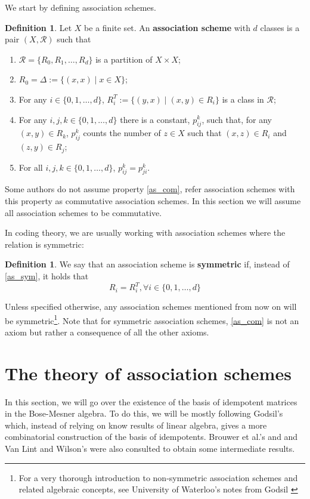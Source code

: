\documentclass[a4paper,12pt]{article}
\theoremstyle{plain}
\theoremstyle{definition}
\newtheorem{definition}[theorem]{Definition}
\theoremstyle{remark}
\begin{document}
We start by defining association schemes.
\begin{definition}
    \label{def:association_scheme_partition}
    Let $ X $ be a finite set. An \textbf{association scheme} with $ d $ classes is a
    pair $ (X, \mathcal{R}) $ such that
    \begin{enumerate}[label=(\roman*)]
        \item $ \mathcal{R} = \{ R_0, R_1, \dots, R_d \} $ is a partition of
            $ X \times X $;
        \item $ R_0 = \Delta := \{ (x,x) \mid x \in X \} $;
        \item \label{as_sym}
            For any $ i \in \{ 0,1,\dots,d \} $, $ R_i^T := \{ (y,x) \mid
            (x,y) \in R_i \} $ is a class in $ \mathcal{R} $;
        \item For any $ i,j,k \in \{ 0,1,\dots,d \} $ there is a constant,
            $ p_{ij}^k $, such that, for any $ (x,y) \in R_k $, $ p_{ij}^k $ counts
            the number of $ z \in X $ such that $ (x,z) \in R_i $ and
            $ (z,y) \in R_j $;
        \item \label{as_com}
            For all $ i,j,k \in \{ 0,1,\dots, d \} $, $ p_{ij}^k = p_{ji}^k $.
    \end{enumerate}
\end{definition}
Some authors do not assume property \ref{as_com}, refer association schemes with
this property as commutative association schemes. In this section we will assume
all association schemes to be commutative.

In coding theory, we are usually working with association schemes
where the relation is symmetric:
\begin{definition}
    \label{def:sym_association_scheme_partition}
    We say that an association scheme is \textbf{symmetric} if, instead of \ref{as_sym}, it
    holds that
    \[ R_i = R_i^T, \forall i \in \{ 0,1,\dots,d \} \]
\end{definition}
Unless specified otherwise, any association schemes mentioned from now on will
be symmetric\footnote{For a very thorough introduction to non-symmetric association
schemes and related algebraic concepts, see University of Waterloo's notes from
Godsil \cite{godsil_online}}. Note that for symmetric association schemes, \ref{as_com}
is not an axiom but rather a consequence of all the other axioms.

\section{The theory of association schemes}
In this section, we will go over the existence of the
basis of idempotent matrices in the Bose-Mesner algebra. To do this, we will
be mostly following Godsil's \parencite{godsil_erdoskorado_2015} which, instead of
relying on
know results of linear algebra, gives a more combinatorial construction of the
basis of idempotents. Brouwer et al.'s \parencite{brouwer_distance-regular_1989} and
and Van Lint and Wilson's \parencite{van_lint_course_2001} were also consulted to
obtain some intermediate results.
\end{document}

